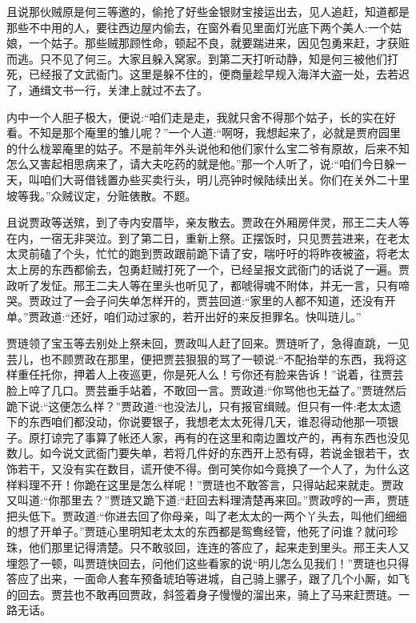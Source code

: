 \begin{parag}
    且说那伙贼原是何三等邀的，偷抢了好些金银财宝接运出去，见人追赶，知道都是那些不中用的人，要往西边屋内偷去，在窗外看见里面灯光底下两个美人:一个姑娘，一个姑子。那些贼那顾性命，顿起不良，就要踹进来，因见包勇来赶，才获赃而逃。只不见了何三。大家且躲入窝家。到第二天打听动静，知是何三被他们打死，已经报了文武衙门。这里是躲不住的，便商量趁早规入海洋大盗一处，去若迟了，通缉文书一行，关津上就过不去了。
\end{parag}


\begin{parag}
    内中一个人胆子极大，便说:“咱们走是走，我就只舍不得那个姑子，长的实在好看。不知是那个庵里的雏儿呢？”一个人道:“啊呀，我想起来了，必就是贾府园里的什么栊翠庵里的姑子。不是前年外头说他和他们家什么宝二爷有原故，后来不知怎么又害起相思病来了，请大夫吃药的就是他。”那一个人听了，说:“咱们今日躲一天，叫咱们大哥借钱置办些买卖行头，明儿亮钟时候陆续出关。你们在关外二十里坡等我。”众贼议定，分赃俵散。不题。
\end{parag}


\begin{parag}
    且说贾政等送殡，到了寺内安厝毕，亲友散去。贾政在外厢房伴灵，邢王二夫人等在内，一宿无非哭泣。到了第二日，重新上祭。正摆饭时，只见贾芸进来，在老太太灵前磕了个头，忙忙的跑到贾政跟前跪下请了安，喘吁吁的将昨夜被盗，将老太太上房的东西都偷去，包勇赶贼打死了一个，已经呈报文武衙门的话说了一遍。贾政听了发怔。邢王二夫人等在里头也听见了，都唬得魂不附体，并无一言，只有啼哭。贾政过了一会子问失单怎样开的，贾芸回道:“家里的人都不知道，还没有开单。”贾政道:“还好，咱们动过家的，若开出好的来反担罪名。快叫琏儿。”
\end{parag}


\begin{parag}
    贾琏领了宝玉等去别处上祭未回，贾政叫人赶了回来。贾琏听了，急得直跳，一见芸儿，也不顾贾政在那里，便把贾芸狠狠的骂了一顿说:“不配抬举的东西，我将这样重任托你，押着人上夜巡更，你是死人么！亏你还有脸来告诉！”说着，往贾芸脸上啐了几口。贾芸垂手站着，不敢回一言。贾政道:“你骂他也无益了。”贾琏然后跪下说:“这便怎么样？”贾政道:“也没法儿，只有报官缉贼。但只有一件:老太太遗下的东西咱们都没动，你说要银子，我想老太太死得几天，谁忍得动他那一项银子。原打谅完了事算了帐还人家，再有的在这里和南边置坟产的，再有东西也没见数儿。如今说文武衙门要失单，若将几件好的东西开上恐有碍，若说金银若干，衣饰若干，又没有实在数目，谎开使不得。倒可笑你如今竟换了一个人了，为什么这样料理不开！你跪在这里是怎么样呢！”贾琏也不敢答言，只得站起来就走。贾政又叫道:“你那里去？”贾琏又跪下道:“赶回去料理清楚再来回。”贾政哼的一声，贾琏把头低下。贾政道:“你进去回了你母亲，叫了老太太的一两个丫头去，叫他们细细的想了开单子。”贾琏心里明知老太太的东西都是鸳鸯经管，他死了问谁？就问珍珠，他们那里记得清楚。只不敢驳回，连连的答应了，起来走到里头。邢王夫人又埋怨了一顿，叫贾琏快回去，问他们这些看家的说“明儿怎么见我们！”贾琏也只得答应了出来，一面命人套车预备琥珀等进城，自己骑上骡子，跟了几个小厮，如飞的回去。贾芸也不敢再回贾政，斜签着身子慢慢的溜出来，骑上了马来赶贾琏。一路无话。
\end{parag}


